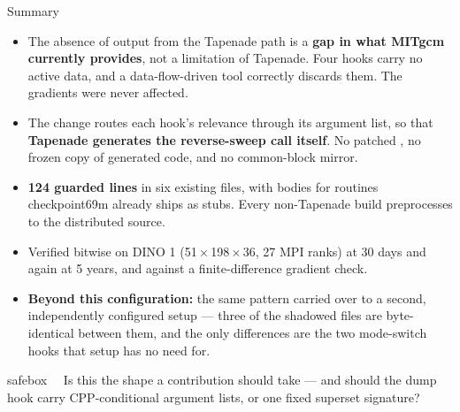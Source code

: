 \begin{frame}{Summary}

\begin{itemize}
  \item The absence of  output from the Tapenade path is a
        \textbf{gap in what MITgcm currently provides}, not a limitation of
        Tapenade. Four hooks carry no active data, and a data-flow-driven tool
        correctly discards them. The  gradients were never
        affected.
  \item The change routes each hook's relevance through its argument list, so
        that \textbf{Tapenade generates the reverse-sweep call itself}. No
        patched , no frozen copy of generated code, and no
        common-block mirror.
  \item \textbf{124 guarded lines} in six existing files, with bodies for
        routines checkpoint69m already ships as stubs. Every non-Tapenade
        build preprocesses to the distributed source.
  \item Verified bitwise on DINO 1\textdegree{}
        (51\,$\times$\,198\,$\times$\,36, 27 MPI ranks) at 30 days and again at
        5 years, and against a finite-difference gradient check.
  \item \textbf{Beyond this configuration:} the same pattern carried over to a
        second, independently configured setup --- three of the shadowed files
        are byte-identical between them, and the only differences are the two
        mode-switch hooks that setup has no need for.
\end{itemize}

\vfill
\begin{beamercolorbox}[wd=\textwidth,sep=6pt]{safebox}
  \ \ 
  Is this the shape a contribution should take --- and should the dump hook
  carry CPP-conditional argument lists, or one fixed superset signature?
\end{beamercolorbox}
\end{frame}
